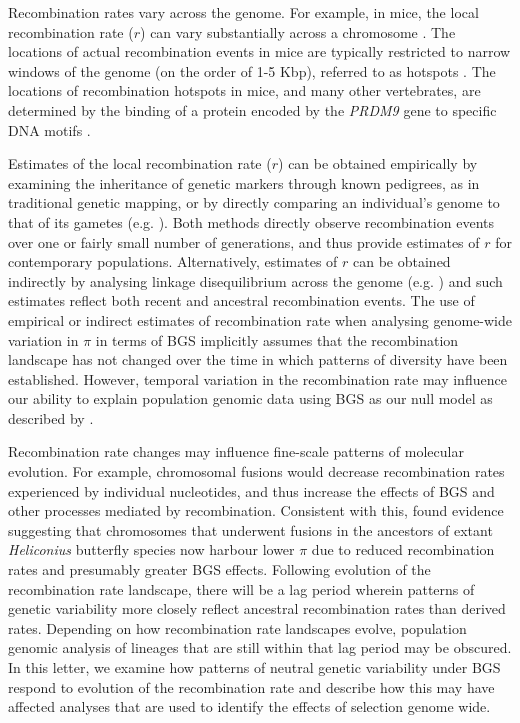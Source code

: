 \documentclass[11pt,twoside, onecolumn]{GSA_format}
\begin{document}
\vspace{5px}
 
Recombination rates vary across the genome. For example, in mice, the local recombination rate ($r$) can vary substantially across a chromosome \cite{RN263}. The locations of actual recombination events in mice are typically restricted to narrow windows of the genome (on the order of 1-5 Kbp), referred to as hotspots \citep{RN263}. The locations of recombination hotspots in mice, and many other vertebrates, are determined by the binding of a protein encoded by the \textit{PRDM9} gene to specific DNA motifs \citep{RN269, Baker2017}.

\vspace{5px}

Estimates of the local recombination rate ($r$) can be obtained empirically by examining the inheritance of genetic markers through known pedigrees, as in traditional genetic mapping, or by directly comparing an individual's genome to that of its gametes (e.g. \citealt{Sun2019}). Both methods directly observe recombination events over one or fairly small number of generations, and thus provide estimates of $r$ for contemporary populations. Alternatively, estimates of $r$ can be obtained indirectly by analysing linkage disequilibrium across the genome (e.g. \citealt{Spence2019}) and such estimates reflect both recent and ancestral recombination events. The use of empirical or indirect estimates of recombination rate when analysing genome-wide variation in $\pi$ in terms of BGS implicitly assumes that the recombination landscape has not changed over the time in which patterns of diversity have been established. However, temporal variation in the recombination rate may influence our ability to explain population genomic data using BGS as our null model as described by \cite{Comeron2017-jc}.

\vspace{5px}


Recombination rate changes may influence fine-scale patterns of molecular evolution. For example, chromosomal fusions would decrease recombination rates experienced by individual nucleotides, and thus increase the effects of BGS and other processes mediated by recombination. Consistent with this, \cite{Cicconardi2021}  found evidence suggesting that chromosomes that underwent fusions in the ancestors of extant \textit{Heliconius} butterfly species now harbour lower $\pi$ due to reduced recombination rates and presumably greater BGS effects. Following evolution of the recombination rate landscape, there will be a lag period wherein patterns of genetic variability more closely reflect ancestral recombination rates than derived rates. Depending on how recombination rate landscapes evolve, population genomic analysis of lineages that are still within that lag period may be obscured. In this letter, we examine how patterns of neutral genetic variability under BGS respond to evolution of the recombination rate and describe how this may have affected analyses that are used to identify the effects of selection genome wide. 
\end{document}
